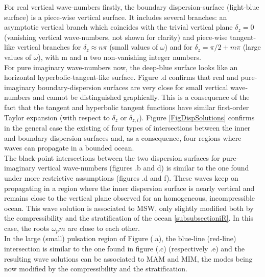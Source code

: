\documentclass[a4paper,11pt]{article}
\begin{document}
For real vertical wave-numbers firstly, the boundary dispersion-surface (light-blue surface) is a piece-wise vertical surface. It includes several branches: an asymptotic vertical branch which coincides with the trivial vertical plane $\delta_z=0$ (vanishing vertical wave-numbers, not shown for clarity) and piece-wise tangent-like vertical branches for $\delta_z \approx n\pi$ (small values of $\omega$) and for $\delta_z = \pi/2+m\pi$ (large values of $\omega$), with m and n two non-vanishing integer numbers. \\
For pure imaginary wave-numbers now, the deep-blue surface looks like an horizontal hyperbolic-tangent-like surface. Figure .d confirms that real and pure-imaginary boundary-dispersion surfaces are very close for small vertical wave-numbers and cannot be distinguished graphically. This is a consequence of the fact that the tangent and hyperbolic tangent functions have similar first-order Taylor expansion (with respect to $\delta_z$ or $\delta_{z,i}$).
Figure \ref{FigDispSolutions} confirms in the general case the existing of four types of intersections between the inner and boundary dispersion surfaces and, as a consequence, four regions where waves can propagate in a bounded ocean.\\
The black-point intersections between the two dispersion surfaces for pure-imaginary vertical wave-numbers (figures .b and d) is similar to the one found under more restrictive assumptions (figures .d and f). These waves keep on propagating in a region where the inner dispersion surface is nearly vertical and remains close to the vertical plane observed for an homogeneous, incompressible ocean. This wave solution is associated to MSW, only slightly modified both by the compressibility and the stratification of the ocean \ref{subsubsectioniR}. In this case, the roots $\omega_pm$ are close to each other.\\
In the large (small) pulsation region of Figure (.a), the blue-line (red-line) intersection is similar to the one found in figure (.c) (respectively .e) and the resulting wave solutions can be associated to MAM and MIM, the modes being now modified by the compressibility and the stratification.\\
\end{document}
